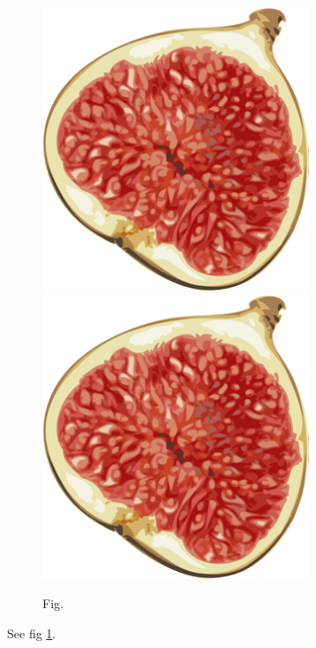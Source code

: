 \documentclass{article}
\begin{document}
  \begin{figure}[h]
    \includegraphics[width=8cm]{fig.png}
    \includegraphics[width=8cm]{fig.png}
    \caption{Fig.}
    \label{fig:fig}
  \end{figure}
  See fig \ref{fig:fig}.
\end{document}
